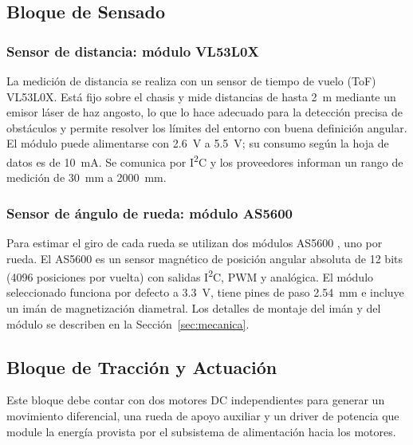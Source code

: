\subsection{Bloque de Sensado}
\subsubsection{Sensor de distancia: módulo VL53L0X}
La medición de distancia se realiza con un sensor de tiempo de vuelo (ToF) VL53L0X\cite{vl53mod}. Está fijo sobre el chasis y mide distancias de hasta \SI{2}{m} mediante un emisor láser de haz angosto, lo que lo hace adecuado para la detección precisa de obstáculos y permite resolver los límites del entorno con buena definición angular. El módulo puede alimentarse con \SI{2,6}{V} a \SI{5,5}{V}; su consumo según la hoja de datos es de \SI{10}{mA}. Se comunica por I\textsuperscript{2}C y los proveedores informan un rango de medición de \SI{30}{mm} a \SI{2000}{mm}.

\subsubsection{Sensor de ángulo de rueda: módulo AS5600}
Para estimar el giro de cada rueda se utilizan dos módulos AS5600 \cite{as5600mod}, uno por rueda. El AS5600 es un sensor magnético de posición angular absoluta de 12 bits (4096 posiciones por vuelta) con salidas I\textsuperscript{2}C, PWM y analógica. El módulo seleccionado funciona por defecto a \SI{3,3}{V}, tiene pines de paso \SI{2,54}{mm} e incluye un imán de magnetización diametral. Los detalles de montaje del imán y del módulo se describen en la Sección~\ref{sec:mecanica}.


\subsection{Bloque de Tracción y Actuación}
Este bloque debe contar con dos motores DC independientes para generar un movimiento diferencial, una rueda de apoyo auxiliar y un driver de potencia que module la energía provista por el subsistema de alimentación hacia los motores.

